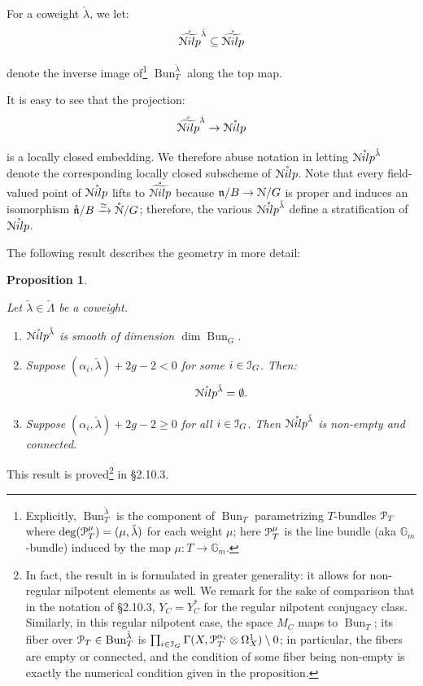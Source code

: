 \documentclass[reqno,11pt]{amsart}
\numberwithin{equation}{subsection}
\newtheorem{prop}[thm]{Proposition}
\theoremstyle{remark}
\newcommand{\xar}[1]{\xrightarrow{#1}}
\newcommand{\rar}[1]{\xar{#1}}
\newcommand{\isom}{\rar{\simeq}}
\newcommand{\bG}{{\mathbb G}}
\newcommand{\sI}{{\EuScript I}}
\newcommand{\sN}{{\EuScript N}}
\newcommand{\sP}{{\EuScript P}}
\newcommand{\fn}{{\mathfrak n}}
\newcommand{\on}{\operatorname}
\newcommand{\Bun}{\on{Bun}}
\renewcommand{\o}[1]{\mathring{#1}}
\renewcommand{\subset}{\subseteq}
\newcommand{\Nilp}{\sN ilp}
\begin{document}
For a coweight $\check{\lambda}$, we let:
%
\[
\o{\widetilde{\Nilp}}^{\check{\lambda}} \subset 
\o{\widetilde{\Nilp}}
\]

\noindent denote the inverse image of\footnote{Explicitly, $\Bun_T^{\check{\lambda}}$
is the component of $\Bun_T$ parametrizing
$T$-bundles $\sP_T$ where $\deg(\sP_T^{\mu}) = (\mu,\check{\lambda})$
for each weight $\mu$; here $\sP_T^{\mu}$ is the line bundle (aka $\bG_m$-bundle)
induced by the map $\mu:T \to \bG_m$.}
$\Bun_T^{\check{\lambda}}$ along the top map.

It is easy to see that the projection:
%
\[
\o{\widetilde{\Nilp}}^{\check{\lambda}} \to \o{\Nilp}
\]

\noindent is a locally closed embedding. We therefore
abuse notation in letting $\o{\Nilp}^{\check{\lambda}}$ denote
the corresponding locally closed subscheme of $\o{\Nilp}$.
Note that every field-valued point of $\o{\Nilp}$ lifts
to $\o{\widetilde{\Nilp}}$ because $\fn/B \to \sN/G$ is 
proper and induces an isomorphism $\o{\fn}/B \isom \o{\sN}/G$;
therefore, the various $\o{\Nilp}^{\check{\lambda}}$ define 
a stratification of $\o{\Nilp}$.

The following result describes the geometry in more detail:

\begin{prop}\label{p:nilp-reg}

Let $\check{\lambda} \in \check{\Lambda}$ be a coweight.

\begin{enumerate}

\item $\o{\Nilp}^{\check{\lambda}}$ is smooth of dimension $\dim \Bun_G$.

\item Suppose $(\alpha_i,\check{\lambda})+2g-2 < 0$ for some
$i \in \sI_G$. Then: 
%
\[
\o{\Nilp}^{\check{\lambda}} = \emptyset.
\]

\item Suppose $(\alpha_i,\check{\lambda})+2g-2 \geq 0$ for all $i \in \sI_G$.
Then $\o{\Nilp}^{\check{\lambda}}$ is non-empty and connected.

\end{enumerate}

\end{prop}

This result is proved\footnote{In fact, the result in \cite{hitchin}
is formulated in greater generality: it allows for non-regular nilpotent
elements as well. We remark for the sake of comparison 
that in the notation of \cite{hitchin}
\S 2.10.3, $Y_C = Y_C^{*}$ for the regular nilpotent conjugacy class.
Similarly, in this regular nilpotent case, the space 
$M_C$ maps to $\Bun_T$; its fiber over $\sP_T \in \Bun_T^{\check{\lambda}}$
is $\prod_{i \in \sI_G} \Gamma(X,\sP_T^{\alpha_i} \otimes \Omega_X^1) \setminus 0$;
in particular, the fibers are empty or connected, and the condition of 
some fiber being non-empty is exactly the numerical condition given in the proposition.
} 
in \cite{hitchin} \S 2.10.3.
\end{document}
